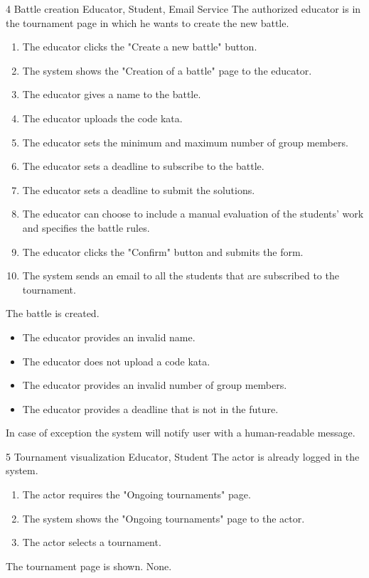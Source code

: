 \usecase
{4}
{Battle creation}
{Educator, Student, Email Service}
{The authorized educator is in the tournament page in which he wants to create the new battle.}
{
    \begin{enumerate}
        \item The educator clicks the "Create a new battle" button.
        \item The system shows the "Creation of a battle" page to the educator.
        \item The educator gives a name to the battle.
        \item The educator uploads the code kata.
        \item The educator sets the minimum and maximum number of group members.
        \item The educator sets a deadline to subscribe to the battle.
        \item The educator sets a deadline to submit the solutions.
        \item The educator can choose to include a manual evaluation of the students' work and specifies the battle rules.
        \item The educator clicks the "Confirm" button and submits the form.
        \item The system sends an email to all the students that are subscribed to the tournament.
    \end{enumerate}
}
{The battle is created.}
{
    \begin{itemize}
        \item The educator provides an invalid name.
        \item The educator does not upload a code kata.
        \item The educator provides an invalid number of group members.
        \item The educator provides a deadline that is not in the future.
    \end{itemize}
}
{
    In case of exception the system will notify user with a human-readable message.
}


\clearpage

\usecase
{5}
{Tournament visualization}
{Educator, Student}
{The actor is already logged in the system.}
{
    \begin{enumerate}
        \item The actor requires the "Ongoing tournaments" page.
        \item The system shows the "Ongoing tournaments" page to the actor.
        \item The actor selects a tournament.
    \end{enumerate}
}
{The tournament page is shown.}
{
    None.
}
{}


